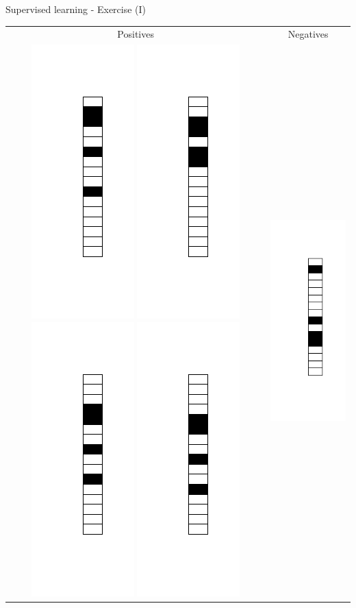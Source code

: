 \documentclass[color=usenames,dvipsnames]{beamer}
\begin{document}
\begin{frame}{Supervised learning - Exercise (I)} 



\begin{table}[ht]
\centering
\begin{tabular}{c|c}
Positives&Negatives\\
\includegraphics[width=0.1\linewidth]{../figures/1d_pattern_supervised_learning_1.png}
\includegraphics[width=0.1\linewidth]{../figures/1d_pattern_supervised_learning_2.png}
\includegraphics[width=0.1\linewidth]{../figures/1d_pattern_supervised_learning_3.png}
\includegraphics[width=0.1\linewidth]{../figures/1d_pattern_supervised_learning_4.png}&
\includegraphics[width=0.1\linewidth]{../figures/1d_random_supervised_learning_1.png}

\end{tabular}
\end{table}
\end{frame}
\end{document}
